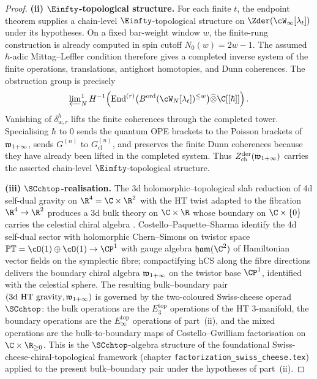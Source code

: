 \begin{proof}
\textbf{(ii) $\Einfty$-topological structure.}
For each finite \(t\), the endpoint theorem supplies a chain-level
\(\Einfty\)-topological structure on
\(\Zder(\cW_\infty[\lambda_t])\) under its hypotheses. On a fixed
bar-weight window \(w\), the finite-rung construction is already
computed in spin cutoff \(N_0(w)=2w-1\). The assumed
\(\hbar\)-adic Mittag--Leffler condition therefore gives a completed
inverse system of the finite operations, translations, antighost
homotopies, and Dunn coherences. The obstruction group is precisely
\[
\varprojlim\nolimits_N^{1}
H^{-1}\!\left(\operatorname{End}^{(r)}
\bigl(B^{\mathrm{ord}}(\cW_N[\lambda_t])^{\le w}\bigr)
\widehat{\otimes}\C[[\hbar]]\right).
\]
Vanishing of \(\delta^\hbar_{w,r}\) lifts the finite coherences through
the completed tower. Specialising \(\hbar\) to \(0\) sends the quantum
OPE brackets to the Poisson brackets of \(\mathfrak{w}_{1+\infty}\), sends
\(G^{(n)}\) to \(G^{(n)}_{\mathrm{cl}}\), and preserves the finite
Dunn coherences because they have already been lifted in the completed
system. Thus
\(Z^{\mathrm{der}}_{\mathrm{ch}}(\mathfrak{w}_{1+\infty})\) carries the asserted
chain-level \(\Einfty\)-topological structure.

\textbf{(iii) $\SCchtop$-realisation.}
The 3d holomorphic--topological slab reduction of 4d self-dual gravity
on $\R^4 = \C \times \R^2$ with the HT twist adapted to the fibration
$\R^4 \to \R^2$ produces a 3d bulk theory on $\C \times \R$ whose
boundary on $\C \times \{0\}$ carries the celestial chiral algebra
\cite{CostelloPaquetteSharmaCelestial,
BittlestonHeuvelineSkinner}. Costello--Paquette--Sharma identify the
4d self-dual sector with holomorphic Chern--Simons on twistor space
$\mathbb{PT} = \cO(1)\oplus\cO(1) \to \CP^1$ with gauge algebra
$\mathfrak{ham}(\C^2)$ of Hamiltonian vector fields on the symplectic
fibre; compactifying hCS along the fibre directions delivers the
boundary chiral algebra $\mathfrak{w}_{1+\infty}$ on the twistor base $\CP^1$,
identified with the celestial sphere. The resulting bulk--boundary pair
$(\text{3d HT gravity}, \mathfrak{w}_{1+\infty})$ is governed by the two-coloured
Swiss-cheese operad $\SCchtop$: the bulk operations are the
$E_3^{\mathrm{top}}$ operations of the HT 3-manifold, the boundary
operations are the \(E_\infty^{\mathrm{top}}\) operations of
part~(ii), and the mixed operations are the bulk-to-boundary maps of
Costello--Gwilliam factorisation on $\C \times \R_{\ge 0}$. This is
the $\SCchtop$-algebra structure of the foundational
Swiss-cheese-chiral-topological framework (chapter
\texttt{factorization\_swiss\_cheese.tex}) applied to the present
bulk--boundary pair under the hypotheses of part~(ii).
\end{proof}

